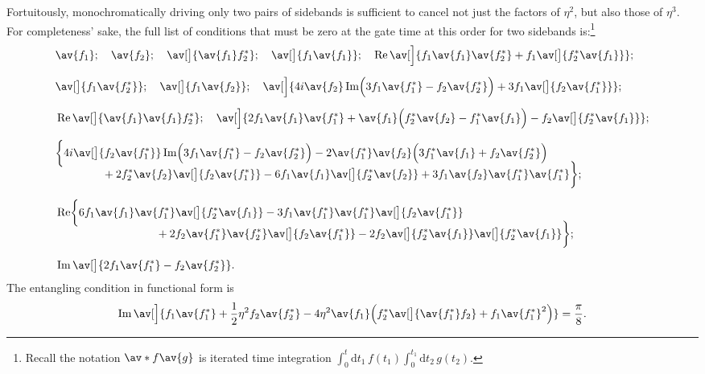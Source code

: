 Fortuitously, monochromatically driving only two pairs of sidebands is sufficient to cancel not just the factors of $\eta^2$, but also those of $\eta^3$.
For completeness' sake, the full list of conditions that must be zero at the gate time at this order for two sidebands is:\footnote{Recall the notation $\av*{\strut f\av{g}}$ is iterated time integration $\int_0^t\mathrm dt_1\,f(t_1)\int_0^{t_1}\mathrm dt_2\,g(t_2)$.}
{\allowdisplaybreaks\begin{align}
    &\av{f_1};\quad \label{eq:beyondld-c1} %
     \av{f_2};\quad
     \av[\big]{\av{f_1} f_2^*};\quad
     \av[\big]{f_1 \av{f_1}};\quad
     \Re\av[\Big]{f_1\av{f_1}\av{f_2^*} + f_1\av[\big]{f_2^*\av{f_1}}};\\[2\jot]
%
    &\av[\big]{f_1\av{f_2^*}};\quad
     \av[\big]{f_1\av{f_2}};\quad
     \av[\Big]{4i\av{f_2}\Im\Bigl(3f_1\av{f_1^*} - f_2\av{f_2^*}\Bigr) + 3f_1\av[\big]{f_2\av{f_1^*}}};\\[2\jot]
%
    &\Re\av[\big]{\av{f_1} \av{f_1} f_2^*};\quad
     \av[\Big]{2f_1\av{f_1}\av{f_1^*} + \av{f_1}\Bigl(f_2^*\av{f_2} - f_1^*\av{f_1}\Bigr)- f_2\av[\big]{f_2^*\av{f_1}}};
     \\[2\jot]
%
    &\!\begin{multlined}\biggl\{
        4i\av[\big]{f_2\av{f_1^*}}\Im\Bigl(3f_1\av{f_1^*} - f_2\av{f_2^*}\Bigr)
        -2\av{f_1^*}\av{f_2}\Bigl(3f_1^*\av{f_1} + f_2\av{f_2^*}\Bigr)\hspace*{2em}\\[-3\jot]
        +2f_2^*\av{f_2}\av[\big]{f_2\av{f_1^*}}
        -6f_1\av{f_1}\av[\big]{f_2^*\av{f_2}}
        +3f_1\av{f_2}\av{f_1^*}\av{f_1^*}\biggr\};\end{multlined}\\[2\jot]
%
    \label{eq:beyondld-c2}
    &\!\begin{multlined}\Re\biggl\{
        6f_1\av{f_1}\av{f_1^*}\av[\big]{f_2^*\av{f_1}}
        -3f_1\av{f_1^*}\av{f_1^*}\av[\big]{f_2\av{f_1^*}}\hspace*{8.8em}\\[-3\jot]
        +2f_2\av{f_1^*}\av{f_2^*}\av[\big]{f_2\av{f_1^*}}
        -2f_2\av[\big]{f_2^*\av{f_1}}\av[\big]{f_2^*\av{f_1}}
        \biggr\};\end{multlined}\\[2\jot]
%
    &\Im\av[\big]{2f_1\av{f_1^*} - f_2\av{f_2^*}}. \label{eq:beyondld-resonant}
\end{align}}%
The entangling condition in functional form is
\begin{equation}\label{eq:beyondld-third-order-entangling-functional}
\Im\av[\Big]{f_1 \av{f_1^*} + \frac12\eta^2f_2\av{f_2^*} - 4\eta^2 \av{f_1}\Bigl(f_2^* \av[\big]{\av{f_1^*} f_2} + f_1 \av{f_1^*}^{2}\Bigr)}
    = \frac\pi8.
\end{equation}

